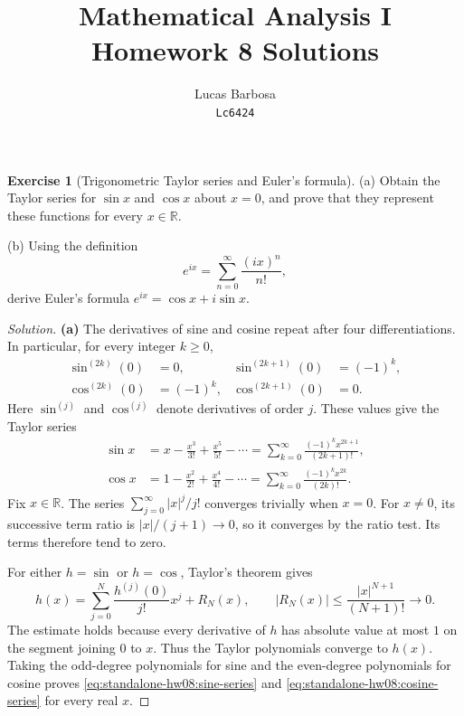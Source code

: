 \documentclass[11pt,letterpaper]{article}
\title{Mathematical Analysis I\\Homework 8 Solutions}
\author{Lucas Barbosa\\\texttt{Lc6424}}
\date{}
\newcommand{\R}{\mathbb{R}}
\theoremstyle{definition}
\newtheorem{exercise}{Exercise}
\begin{document}
\maketitle

\begin{exercise}[Trigonometric Taylor series and Euler's formula]
  \label{ex:standalone-hw08:trigonometric-series}
  \textup{(a)} Obtain the Taylor series for $\sin x$ and $\cos x$ about
  $x=0$, and prove that they represent these functions for every $x\in\R$.

  \textup{(b)} Using the definition
  \[
    e^{ix}=\sum_{n=0}^{\infty}\frac{(ix)^n}{n!},
  \]
  derive Euler's formula $e^{ix}=\cos x+i\sin x$.
\end{exercise}

\begin{proof}[Solution]
  \textbf{(a)} The derivatives of sine and cosine repeat after four
  differentiations. In particular, for every integer $k\ge0$,
  \[
    \begin{aligned}
      \sin^{(2k)}(0)&=0,
      &\sin^{(2k+1)}(0)&=(-1)^k,\\
      \cos^{(2k)}(0)&=(-1)^k,
      &\cos^{(2k+1)}(0)&=0.
    \end{aligned}
  \]
  Here $\sin^{(j)}$ and $\cos^{(j)}$ denote derivatives of order $j$.
  These values give the Taylor series
  \begin{align}
    \sin x
      &=x-\frac{x^3}{3!}+\frac{x^5}{5!}-\cdots
        =\sum_{k=0}^{\infty}\frac{(-1)^k x^{2k+1}}{(2k+1)!},
      \label{eq:standalone-hw08:sine-series}\\
    \cos x
      &=1-\frac{x^2}{2!}+\frac{x^4}{4!}-\cdots
        =\sum_{k=0}^{\infty}\frac{(-1)^k x^{2k}}{(2k)!}.
      \label{eq:standalone-hw08:cosine-series}
  \end{align}
  Fix $x\in\R$. The series $\sum_{j=0}^{\infty}|x|^j/j!$ converges
  trivially when $x=0$. For $x\ne0$, its successive term ratio is
  $|x|/(j+1)\to0$, so it converges by the ratio test. Its terms therefore
  tend to zero.

  For either $h=\sin$ or $h=\cos$, Taylor's theorem gives
  \[
    h(x)=\sum_{j=0}^{N}\frac{h^{(j)}(0)}{j!}x^j+R_N(x),
    \qquad
    |R_N(x)|\le\frac{|x|^{N+1}}{(N+1)!}\longrightarrow0.
  \]
  The estimate holds because every derivative of $h$ has absolute value
  at most $1$ on the segment joining $0$ to $x$. Thus the Taylor
  polynomials converge to $h(x)$. Taking the odd-degree
  polynomials for sine and the even-degree polynomials for cosine proves
  \autoref{eq:standalone-hw08:sine-series} and
  \autoref{eq:standalone-hw08:cosine-series} for every real $x$.


\end{proof}
\end{document}
